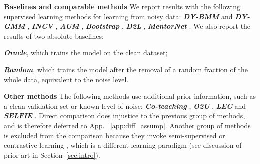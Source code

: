 \documentclass{article}
\newcommand{\myparagpar}[1]{\noindent\textbf{#1}}
\begin{document}
\myparagpar{Baselines and comparable methods} We report results with the following supervised learning methods for learning from noisy data: 
\textbf{\emph{DY-BMM}} and \textbf{\emph{DY-GMM}} \citep{arazo2019unsupervised},  \textbf{\emph{INCV}} \citep{chen2019understanding}, \textbf{\emph{AUM}} \citep{pleiss2020identifying}, \textbf {\emph{Bootstrap}} \citep{reed2014training}, \textbf{\emph{D2L}} \citep{ma2018dimensionality},  \textbf{\emph{MentorNet}} \citep{jiang2018mentornet}. We also report the results of two absolute baselines: \begin{inparaenum}[(i)] \item \textbf{\emph{Oracle}}, which trains the model on the clean dataset; \item \textbf{\emph{Random}}, which trains the model after the removal of a random fraction of the whole data, equivalent to the noise level. \end{inparaenum}

\myparagpar{Other methods} The following methods use additional prior information, such as a clean validation set or known level of noise: \textbf{\emph{Co-teaching}}  \citep{han2018co}, \textbf{\emph{O2U}} \citep{o2u}, \textbf{\emph{LEC}} \citep{lec} and \textbf{\emph{SELFIE}} \citep{song2019selfie}. Direct comparison does injustice to the previous group of methods, and is therefore deferred to App. ~\ref{app:diff_assump}. Another group of methods is excluded from the comparison because they invoke semi-supervised or contrastive learning  \citep[e.g.,][]{MOIT, li2020dividemix, UNICON, Sel-CL, JoCoR,JoSRC}, which is a different learning paradigm (see discussion of prior art in Section~\ref{sec:intro}).
\end{document}
